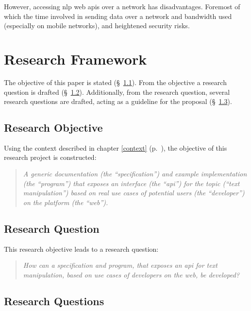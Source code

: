 However, accessing \gls{nlp} web \glspl{api} over a network has
  disadvantages.
Foremost of which the time involved in sending data over a network and
  bandwidth used (especially on mobile networks), and heightened security
  risks.

\chapter{Research Framework}\label{research-framework}

The objective of this paper is stated (§~\ref{research-objective}).
From the objective a research question is drafted
  (§~\ref{research-question}).
Additionally, from the research question, several research questions are
  drafted, acting as a guideline for the proposal
  (§~\ref{research-questions}).

\section{Research Objective}\label{research-objective}

Using the context described in chapter \ref{context} (p.~\pageref{context}),
  the objective of this research project is constructed:

\begin{quote}
  \textit{A generic documentation (the ``specification'') and example
    implementation (the ``program'') that exposes an interface (the
    ``\acrshort{api}'') for the topic (``text manipulation'') based on real
    use cases of potential users (the ``developer'') on the platform (the
    ``web'').
  }
\end{quote}

\section{Research Question}\label{research-question}

This research objective leads to a research question:

\begin{quote}
  \textit{How can a specification and program, that exposes an \acrshort{api}
    for text manipulation, based on use cases of developers on the web,
    be developed?
  }
\end{quote}

\section{Research Questions}\label{research-questions}

